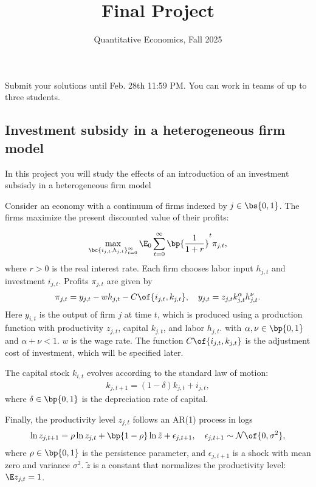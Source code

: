 \documentclass[english,hyperref={pdftex,pdfpagemode=UseNone,hidelinks}]{tufte-handout}
\title{Final Project}
\author{Quantitative Economics, Fall 2025}
\begin{document}
\maketitle
Submit your solutions until Feb. 28th 11:59 PM. You can work in teams of up to three students.   



\subsection*{Investment subsidy in a heterogeneous firm model } 


In this project you will study the effects of an introduction of an investment subsisdy in a heterogeneous firm model

Consider an economy with a continuum of firms indexed by $j\in\bs{0,1}$. The firms maximize the present discounted value of their profits:

\begin{align*}
\max_{\bc{{i_{j,t},h_{j,t}}}_{t=0}^\infty} \E_0\sum_{t=0}^\infty \bp{\frac{1}{1+r}}^t \pi_{j,t},
\end{align*}
where $r >0$ is the real interest rate. Each firm chooses labor input $h_{j,t}$ and investment $i_{j,t}$.  Profits $
\pi_{j,t}$ are given by 
\begin{align*}
\pi_{j,t} = y_{j,t} - w h_{j,t} - C\of{i_{j,t},k_{j,t}}, \quad y_{j,t} = z_{j,t} k_{j,t}^\alpha h_{j,t}^\nu.
\end{align*}
Here $y_{i,t}$ is the output of firm $j$ at time $t$, which is produced using a production function with productivity $z_{j,t}$, capital $k_{j,t}$, and labor $h_{j,t}$. with $
\alpha,\nu\in\bp{0,1}$ and $\alpha + \nu < 1$. $w$ is the wage rate. The function $C\of{i_{j,t},k_{j,t}}$ is the adjustment cost of investment, which will be specified later. 

The capital stock $k_{i,t}$ evolves according to the standard law of motion:
\begin{align*}
k_{j,t+1} = (1-\delta) k_{j,t} + i_{j,t},
\end{align*} where $\delta\in\bp{0,1}$ is the depreciation rate of capital.

Finally, the productivity level $z_{j,t}$ follows an AR(1) process in logs \begin{align*}
\ln z_{j,t+1} = \rho \ln z_{j,t} + \bp{1-\rho}  \ln \tilde{z} + \epsilon_{j,t+1}, \quad \epsilon_{j,t+1}\sim \mathcal{N}\of{0,\sigma^2},
\end{align*} where $\rho\in\bp{0,1}$ is the persistence parameter, and $\epsilon_{j,t+1}$ is a shock with mean zero and variance $\sigma^2$. $\tilde{z}$ is a constant that normalizes the productivity level: $\E z_{j,t} = 1$.
\end{document}
